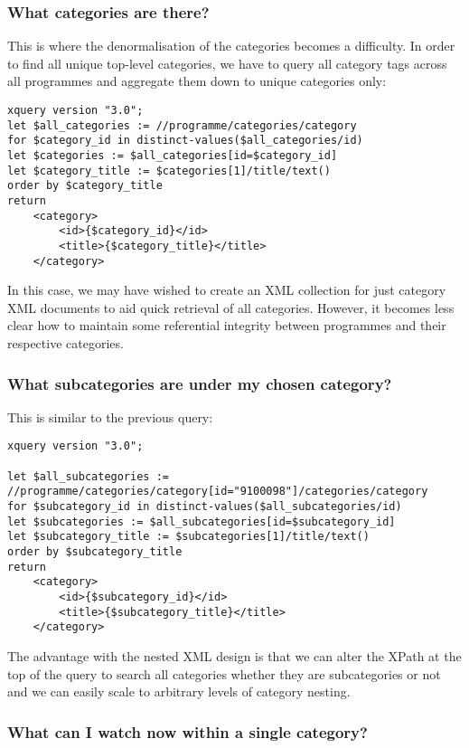 \documentclass[11pt,a4paper]{article}
\begin{document}
\subsubsection{What categories are there?}

This is where the denormalisation of the categories becomes a difficulty.
In order to find all unique top-level categories, we have to query all
category tags across all programmes and aggregate them down to unique
categories only:

\begin{lstlisting}
xquery version "3.0";
let $all_categories := //programme/categories/category
for $category_id in distinct-values($all_categories/id)
let $categories := $all_categories[id=$category_id]
let $category_title := $categories[1]/title/text()
order by $category_title
return 
    <category>
        <id>{$category_id}</id>
        <title>{$category_title}</title>
    </category>
\end{lstlisting}

In this case, we may have wished to create an XML collection for just
category XML documents to aid quick retrieval of all categories. However,
it becomes less clear how to maintain some referential integrity
between programmes and their respective categories.

\subsubsection{What subcategories are under my chosen category?}

This is similar to the previous query:

\begin{lstlisting}
xquery version "3.0";

let $all_subcategories := //programme/categories/category[id="9100098"]/categories/category
for $subcategory_id in distinct-values($all_subcategories/id)
let $subcategories := $all_subcategories[id=$subcategory_id]
let $subcategory_title := $subcategories[1]/title/text()
order by $subcategory_title
return 
    <category>
        <id>{$subcategory_id}</id>
        <title>{$subcategory_title}</title>
    </category>
\end{lstlisting}

The advantage with the nested XML design is that we can alter the XPath at
the top of the query to search all categories whether they are subcategories
or not and we can easily scale to arbitrary levels of category nesting.

\subsubsection{What can I watch now within a single category?}
\end{document}
